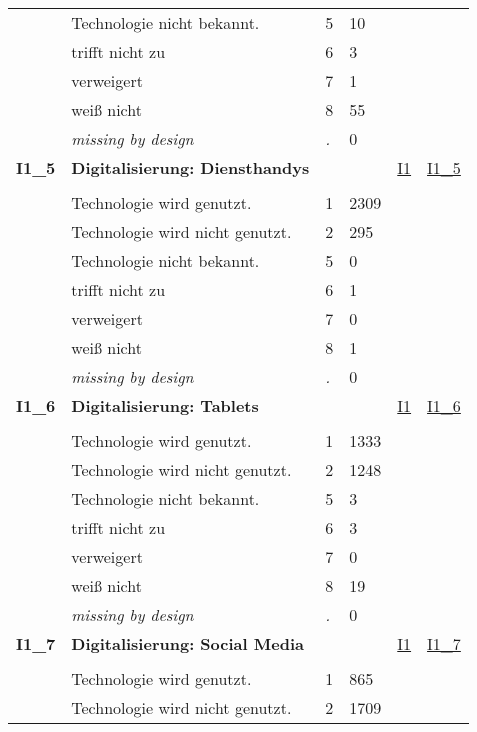 \begin{longtable}{| L{2.45cm} | L{6cm} | C{1.5cm} | R{1cm} | C{2.25cm} | C{2.25cm} |}
   & Technologie nicht bekannt. & 5 & 10 &  &  \\ 
   & trifft nicht zu & 6 & 3 &  &  \\ 
   & verweigert & 7 & 1 &  &  \\ 
   & weiß nicht & 8 & 55 &  &  \\ 
   & \textit{missing by design} & \textit{.} & 0 &  &  \\ 
   \midrule
\textbf{I1\_5}\label{var:I1:5} & \textbf{Digitalisierung: Diensthandys} &  &  & \hyperref[I1]{I1} & \hyperref[var:suf:I1:5]{I1\_5} \\ 
   &  &  &  &  &  \\ 
   & Technologie wird genutzt. & 1 & 2309 &  &  \\ 
   & Technologie wird nicht genutzt. & 2 & 295 &  &  \\ 
   & Technologie nicht bekannt. & 5 & 0 &  &  \\ 
   & trifft nicht zu & 6 & 1 &  &  \\ 
   & verweigert & 7 & 0 &  &  \\ 
   & weiß nicht & 8 & 1 &  &  \\ 
   & \textit{missing by design} & \textit{.} & 0 &  &  \\ 
   \midrule
\textbf{I1\_6}\label{var:I1:6} & \textbf{Digitalisierung: Tablets} &  &  & \hyperref[I1]{I1} & \hyperref[var:suf:I1:6]{I1\_6} \\ 
   &  &  &  &  &  \\ 
   & Technologie wird genutzt. & 1 & 1333 &  &  \\ 
   & Technologie wird nicht genutzt. & 2 & 1248 &  &  \\ 
   & Technologie nicht bekannt. & 5 & 3 &  &  \\ 
   & trifft nicht zu & 6 & 3 &  &  \\ 
   & verweigert & 7 & 0 &  &  \\ 
   & weiß nicht & 8 & 19 &  &  \\ 
   & \textit{missing by design} & \textit{.} & 0 &  &  \\ 
   \midrule
\textbf{I1\_7}\label{var:I1:7} & \textbf{Digitalisierung: Social Media} &  &  & \hyperref[I1]{I1} & \hyperref[var:suf:I1:7]{I1\_7} \\ 
   &  &  &  &  &  \\ 
   & Technologie wird genutzt. & 1 & 865 &  &  \\ 
   & Technologie wird nicht genutzt. & 2 & 1709 &  &  \\ 

\end{longtable}
